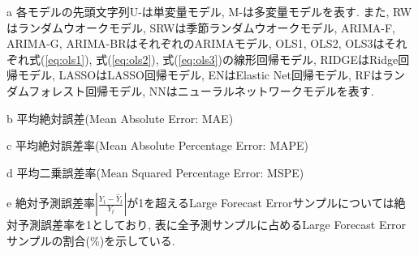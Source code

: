 \begin{threeparttable}[h]
\begin{tablenotes}
\item[a] 各モデルの先頭文字列U-は単変量モデル, M-は多変量モデルを表す. また, RWはランダムウオークモデル, SRWは季節ランダムウオークモデル, ARIMA-F, ARIMA-G, ARIMA-BRはそれぞれ\cite*{foster1977quarterly, griffin1977time, brown1979univariate}のARIMAモデル, OLS1, OLS2, OLS3はそれぞれ式(\ref{eq:ols1}), 式(\ref{eq:ols2}), 式(\ref{eq:ols3})の線形回帰モデル, RIDGEはRidge回帰モデル, LASSOはLASSO回帰モデル, ENはElastic Net回帰モデル, RFはランダムフォレスト回帰モデル, NNはニューラルネットワークモデルを表す.
\item[b] 平均絶対誤差(Mean Absolute Error: MAE)
\item[c] 平均絶対誤差率(Mean Absolute Percentage Error: MAPE)
\item[d] 平均二乗誤差率(Mean Squared Percentage Error: MSPE)
\item[e] 絶対予測誤差率$\left| \frac{Y_t -{\hat Y}_t}{Y_t} \right|$が1を超えるLarge Forecast Errorサンプルについては絶対予測誤差率を1としており, 表に全予測サンプルに占めるLarge Forecast Errorサンプルの割合(\%)を示している.
\end{tablenotes}
\end{threeparttable}  